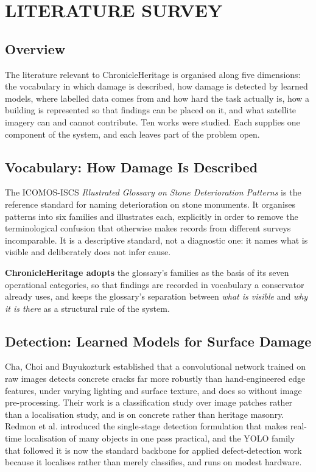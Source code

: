 \documentclass[a4paper,12pt,oneside]{book}
\begin{document}
\chapter{LITERATURE SURVEY}

\section{Overview}
The literature relevant to ChronicleHeritage is organised along five dimensions: the vocabulary in which damage is described, how damage is detected by learned models, where labelled data comes from and how hard the task actually is, how a building is represented so that findings can be placed on it, and what satellite imagery can and cannot contribute. Ten works were studied. Each supplies one component of the system, and each leaves part of the problem open.

\section{Vocabulary: How Damage Is Described}
The ICOMOS-ISCS \textit{Illustrated Glossary on Stone Deterioration Patterns} \cite{icomos2008glossary} is the reference standard for naming deterioration on stone monuments. It organises patterns into six families and illustrates each, explicitly in order to remove the terminological confusion that otherwise makes records from different surveys incomparable. It is a descriptive standard, not a diagnostic one: it names what is visible and deliberately does not infer cause.

\textbf{ChronicleHeritage adopts} the glossary's families as the basis of its seven operational categories, so that findings are recorded in vocabulary a conservator already uses, and keeps the glossary's separation between \textit{what is visible} and \textit{why it is there} as a structural rule of the system.

\section{Detection: Learned Models for Surface Damage}
Cha, Choi and Buyukozturk \cite{cha2017deep} established that a convolutional network trained on raw images detects concrete cracks far more robustly than hand-engineered edge features, under varying lighting and surface texture, and does so without image pre-processing. Their work is a classification study over image patches rather than a localisation study, and is on concrete rather than heritage masonry. Redmon et al. \cite{redmon2016yolo} introduced the single-stage detection formulation that makes real-time localisation of many objects in one pass practical, and the YOLO family that followed it \cite{ultralytics2023yolo} is now the standard backbone for applied defect-detection work because it localises rather than merely classifies, and runs on modest hardware.
\end{document}
